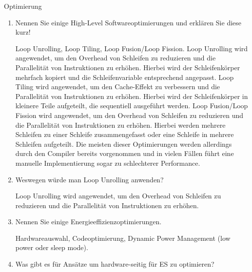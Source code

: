 \documentclass{article}
\begin{document}
\begin{exercise}{Optimierung}
  \begin{enumerate}
    \item Nennen Sie einige High-Level Softwareoptimierungen und erklären Sie diese kurz!

          \begin{solution}
            Loop Unrolling, Loop Tiling, Loop Fusion/Loop Fission.
            Loop Unrolling wird angewendet, um den Overhead von Schleifen zu reduzieren und die Parallelität von Instruktionen zu erhöhen. Hierbei wird der Schleifenkörper mehrfach kopiert und die Schleifenvariable entsprechend angepasst.
            Loop Tiling wird angewendet, um den Cache-Effekt zu verbessern und die Parallelität von Instruktionen zu erhöhen. Hierbei wird der Schleifenkörper in kleinere Teile aufgeteilt, die sequentiell ausgeführt werden.
            Loop Fusion/Loop Fission wird angewendet, um den Overhead von Schleifen zu reduzieren und die Parallelität von Instruktionen zu erhöhen. Hierbei werden mehrere Schleifen zu einer Schleife zusammengefasst oder eine Schleife in mehrere Schleifen aufgeteilt.
            Die meisten dieser Optimierungen werden allerdings durch den Compiler bereits vorgenommen und in vielen Fällen führt eine manuelle Implementierung sogar zu schlechterer Performance.

          \end{solution}

    \item Weswegen würde man Loop Unrolling anwenden?

          \begin{solution}
            Loop Unrolling wird angewendet, um den Overhead von Schleifen zu reduzieren und die Parallelität von Instruktionen zu erhöhen.
          \end{solution}

    \item Nennen Sie einige Energieeffizienzoptimierungen.

          \begin{solution}
            Hardwareauswahl, Codeoptimierung, Dynamic Power Management (low power oder sleep mode).
          \end{solution}

    \item Was gibt es für Ansätze um hardware-seitig für ES zu optimieren?


\end{enumerate}
\end{exercise}
\end{document}
